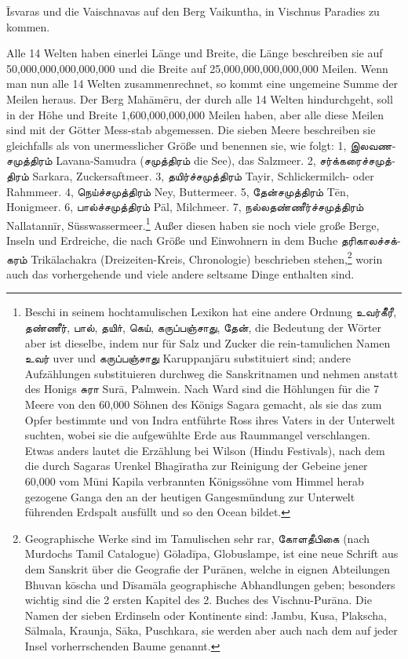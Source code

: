 \documentclass{article}
\newcommand{\TamilText}[1]{\texttamil{#1}}
\newcommand{\tam}[1]{\TamilText{#1}}
\begin{document}
\={I}svaras und die Vaischnavas auf den Berg Vaikuntha, in Vischnus Paradies zu kommen.

Alle 14 Welten haben einerlei Länge und Breite, die Länge beschreiben sie auf 50,000,000,000,000,000 und die Breite auf 25,000,000,000,000,000 Meilen. Wenn man nun alle 14 Welten zusammenrechnet, so kommt eine ungemeine Summe der Meilen heraus. Der Berg Mah\={a}m\={e}ru, der durch alle 14 Welten hindurchgeht, soll in der Höhe und Breite 1,600,000,000,000 Meilen haben, aber alle diese Meilen sind mit der Götter Mess-stab abgemessen. Die sieben Meere beschreiben sie gleichfalls als von unermesslicher Größe und benennen sie, wie folgt: 1, \tam{இலவணசமுத்திரம்} Lavana-Samudra (\tam{சமுத்திரம்} die See), das Salzmeer. 2, \tam{சர்க்கரைச்சமுத்திரம்} Sarkara, Zuckersaftmeer. 3, \tam{தயிர்ச்சமுத்திரம்} Tayir, Schlickermilch- oder Rahmmeer. 4, \tam{நெய்ச்சமுத்திரம்} Ney, Buttermeer. 5, \tam{தேன்சமுத்திரம்} T\={e}n, Honigmeer. 6, \tam{பால்ச்சமுத்திரம்} P\={a}l, Milchmeer. 7, \tam{நல்லதண்ணீர்ச்சமுத்திரம்} Nallatann\={i}r, Süsswassermeer.\footnote{Beschi in seinem hochtamulischen Lexikon hat eine andere Ordnung \tam{உவர்கீீரீ}, \tam{தண்ணீர்}, \tam{பால்}, \tam{தயிா்}, \tam{கெய்}, \tam{கருப்பஞ்சாது}, \tam{தேன்}, die Bedeutung der Wörter aber ist dieselbe, indem nur für Salz und Zucker die rein-tamulichen Namen \tam{உவர்} uver und \tam{கருப்பஞ்சாது} Karuppanj\={a}ru substituiert sind; andere Aufzählungen substituieren durchweg die Sanskritnamen und nehmen anstatt des Honigs \tam{சுரா} Sur\={a}, Palmwein. Nach Ward sind die Höhlungen für die 7 Meere von den 60,000 Söhnen des Königs Sagara gemacht, als sie das zum Opfer bestimmte und von Indra entführte Ross ihres Vaters in der Unterwelt suchten, wobei sie die aufgewühlte Erde aus Raummangel verschlangen. Etwas anders lautet die Erzählung bei Wilson (Hindu Festivals), nach dem die durch Sagaras Urenkel Bhag\={i}ratha zur Reinigung der Gebeine jener 60,000 vom M\={u}ni Kapila verbrannten Königssöhne vom Himmel herab gezogene Ganga den an der heutigen Gangesmündung zur Unterwelt führenden Erdspalt ausfüllt und so den Ocean bildet.} Außer diesen haben sie noch viele große Berge, Inseln und Erdreiche, die nach Größe und Einwohnern in dem Buche \tam{தரிகாலச்சக்கரம்} Trik\={a}lachakra (Dreizeiten-Kreis, Chronologie) beschrieben stehen,\footnote{Geographische Werke sind im Tamulischen sehr rar, \tam{கோளதீபிகை} (nach Murdochs Tamil Catalogue) G\={o}lad\={i}pa, Globuslampe, ist eine neue Schrift aus dem Sanskrit über die Geografie der Pur\={a}nen, welche in eignen Abteilungen Bhuvan k\={o}scha und D\={i}sam\={a}la geographische Abhandlungen geben; besonders wichtig sind die 2 ersten Kapitel des 2. Buches des Vischnu-Pur\={a}na. Die Namen der sieben Erdinseln oder Kontinente sind: Jambu, Kusa, Plakscha, S\={a}lmala, Kraunja, S\={a}ka, Puschkara, sie werden aber auch nach dem auf jeder Insel vorherrschenden Baume genannt.} worin auch das vorhergehende und viele andere seltsame Dinge enthalten sind.
\end{document}

